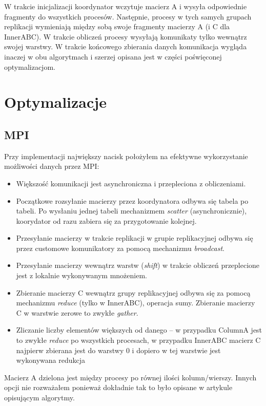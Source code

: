 \documentclass{article}
\begin{document}
W trakcie inicjalizacji koordynator wczytuje macierz A i wysyła odpowiednie fragmenty do wszystkich procesów.
Następnie, procesy w tych samych grupach replikacji wymieniają między sobą swoje fragmenty macierzy A (i C dla InnerABC).
W trakcie obliczeń procesy wysyłają komunikaty tylko wewnątrz swojej warstwy.
W trakcie końcowego zbierania danych komunikacja wygląda inaczej w obu algorytmach i szerzej opisana jest
w części poświęconej optymalizacjom.

\section{Optymalizacje}
\subsection{MPI}
Przy implementacji największy nacisk położyłem na efektywne wykorzystanie możliwości danych przez MPI:
\begin{itemize}
\item Większość komunikacji jest asynchroniczna i przepleciona z obliczeniami. 
\item Początkowe rozsyłanie macierzy przez koordynatora odbywa się tabela po tabeli. 
         Po wysłaniu jednej tabeli mechanizmem \emph{scatter} (asynchronicznie), 
         koorydator od razu zabiera się za przygotowanie kolejnej.
\item Przesyłanie macierzy w trakcie replikacji w grupie replikacyjnej 
         odbywa się przez customowe komunikatory za pomocą mechanizmu \emph{broadcast}.
\item Przesyłanie macierzy wewnątrz warstw (\emph{shift}) w trakcie obliczeń przeplecione jest z lokalnie wykonywanym mnożeniem.
\item Zbieranie macierzy C wewnątrz grupy replikacyjnej odbywa się za pomocą mechanizmu \emph{reduce} (tylko w InnerABC),
         operacja sumy. Zbieranie macierzy C w warstwie zerowe to zwykłe \emph{gather}.
\item Zliczanie liczby elementów większych od danego -- w przypadku ColumnA jest to zwykłe \emph{reduce} po wszystkich procesach,
         w przypadku InnerABC macierz C najpierw zbierana jest do warstwy 0 i dopiero w tej warstwie jest wykonywana redukcja
\end{itemize}

Macierz A dzielona jest między procesy po równej ilości kolumn/wierszy. Innych opcji nie rozważałem ponieważ dokładnie tak
to było opisane w artykule opisującym algorytmy.
\end{document}
